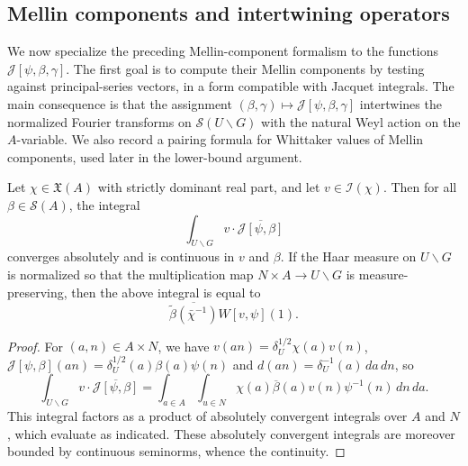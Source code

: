 \subsection{Mellin components and intertwining operators}\label{sec:qual-jacquet-mellin-intertwining}
We now specialize the preceding Mellin-component formalism to the functions $\mathcal{J}[\psi,\beta,\gamma]$.  The first goal is to compute their Mellin components by testing against principal-series vectors, in a form compatible with Jacquet integrals.  The main consequence is that the assignment $(\beta,\gamma) \mapsto \mathcal{J}[\psi,\beta,\gamma]$ intertwines the normalized Fourier transforms on $\mathcal{S}(U \backslash G)$ with the natural Weyl action on the $A$-variable.  We also record a pairing formula for Whittaker values of Mellin components, used later in the lower-bound argument.

\begin{lemma}\label{lem:scratch-research:let-chi-in-1-v-J}
  Let $\chi \in \mathfrak{X}(A)$ with strictly dominant real part, and let $v \in \mathcal{I}(\chi)$.  Then for all $\beta \in \mathcal{S}(A)$, the integral
  \begin{equation*}
    \int_{U \backslash G} v \cdot \overline{\mathcal{J}[\psi, \beta ]}
  \end{equation*}
  converges absolutely and is continuous in $v$ and $\beta$.  If the Haar measure on $U \backslash G$ is normalized so that the multiplication map $N \times A \rightarrow U \backslash G$ is measure-preserving, then the above integral is equal to
  \begin{equation*}
    \overline{\tilde{\beta}(\bar{\chi}^{-1})}
    W[v, \psi](1).
  \end{equation*}
\end{lemma}
\begin{proof}
  For $(a,n) \in A \times N$, we have $v(a n) = \delta_U^{1/2} \chi(a) v(n)$, $\mathcal{J}[\psi,\beta](a n) = \delta_U^{1/2}(a) \beta(a) \psi(n)$ and $d(a n) = \delta_U^{-1}(a) \, d a \, d n$, so
  \begin{equation*}
    \int_{U \backslash G} v \cdot \overline{\mathcal{J}[\psi, \beta ]}
    =
    \int_{a \in A}
    \int_{u \in N}
    \chi(a) \overline{\beta}(a)
    v(n)
    \psi^{-1}(n) \, d n \, d a.
  \end{equation*}
  This integral factors as a product of absolutely convergent integrals over $A$ and $N$, which evaluate as indicated.  These absolutely convergent integrals are moreover bounded by continuous seminorms, whence the continuity.
\end{proof}

